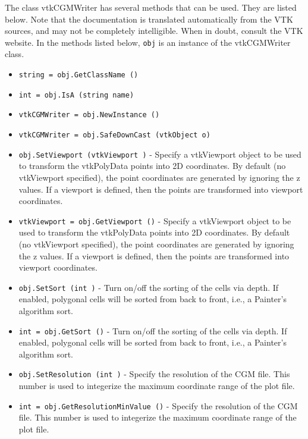 The class vtkCGMWriter has several methods that can be used.
  They are listed below.
Note that the documentation is translated automatically from the VTK sources,
and may not be completely intelligible.  When in doubt, consult the VTK website.
In the methods listed below, \verb|obj| is an instance of the vtkCGMWriter class.
\begin{itemize}
\item  \verb|string = obj.GetClassName ()|

\item  \verb|int = obj.IsA (string name)|

\item  \verb|vtkCGMWriter = obj.NewInstance ()|

\item  \verb|vtkCGMWriter = obj.SafeDownCast (vtkObject o)|

\item  \verb|obj.SetViewport (vtkViewport )| -  Specify a vtkViewport object to be used to transform the vtkPolyData
 points into 2D coordinates. By default (no vtkViewport specified), the 
 point coordinates are generated by ignoring the z values. If a viewport
 is defined, then the points are transformed into viewport coordinates.

\item  \verb|vtkViewport = obj.GetViewport ()| -  Specify a vtkViewport object to be used to transform the vtkPolyData
 points into 2D coordinates. By default (no vtkViewport specified), the 
 point coordinates are generated by ignoring the z values. If a viewport
 is defined, then the points are transformed into viewport coordinates.

\item  \verb|obj.SetSort (int )| -  Turn on/off the sorting of the cells via depth. If enabled, polygonal
 cells will be sorted from back to front, i.e., a Painter's algorithm
 sort.

\item  \verb|int = obj.GetSort ()| -  Turn on/off the sorting of the cells via depth. If enabled, polygonal
 cells will be sorted from back to front, i.e., a Painter's algorithm
 sort.

\item  \verb|obj.SetResolution (int )| -  Specify the resolution of the CGM file. This number is used to integerize
 the maximum coordinate range of the plot file.

\item  \verb|int = obj.GetResolutionMinValue ()| -  Specify the resolution of the CGM file. This number is used to integerize
 the maximum coordinate range of the plot file.


\end{itemize}
